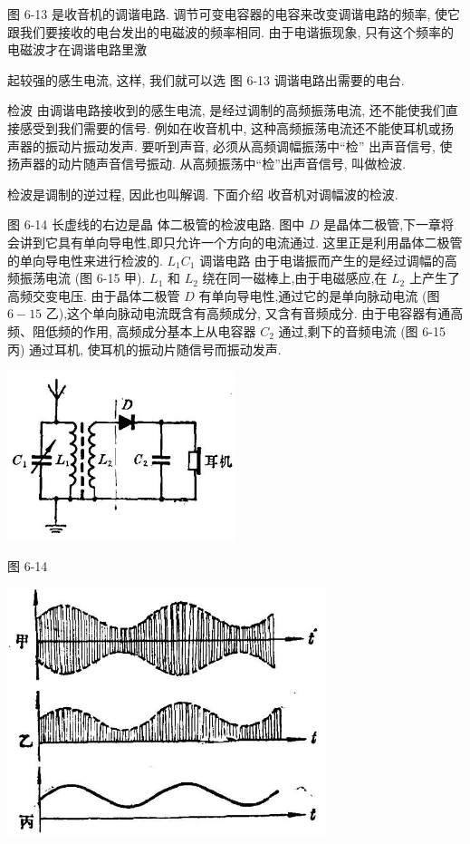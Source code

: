 \documentclass[10pt]{article}
\begin{document}
图 6-13 是收音机的调谐电路. 调节可变电容器的电容来改变调谐电路的频率, 使它跟我们要接收的电台发出的电磁波的频率相同. 由于电谐振现象, 只有这个频率的电磁波才在调谐电路里激

起较强的感生电流, 这样, 我们就可以选 图 6-13 调谐电路出需要的电台.

检波 由调谐电路接收到的感生电流, 是经过调制的高频振荡电流, 还不能使我们直接感受到我们需要的信号. 例如在收音机中, 这种高频振荡电流还不能使耳机或扬声器的振动片振动发声. 要听到声音, 必须从高频调幅振荡中“检” 出声音信号, 使扬声器的动片随声音信号振动. 从高频振荡中“检”出声音信号, 叫做检波.

检波是调制的逆过程, 因此也叫解调. 下面介绍 收音机对调幅波的检波.

图 6-14 长虚线的右边是晶 体二极管的检波电路. 图中 \(D\) 是晶体二极管,下一章将会讲到它具有单向导电性,即只允许一个方向的电流通过. 这里正是利用晶体二极管的单向导电性来进行检波的. \({L}_{1}{C}_{1}\) 调谐电路 由于电谐振而产生的是经过调幅的高频振荡电流 (图 6-15 甲). \({L}_{1}\) 和 \({L}_{2}\) 绕在同一磁棒上,由于电磁感应,在 \({L}_{2}\) 上产生了高频交变电压. 由于晶体二极管 \(D\) 有单向导电性,通过它的是单向脉动电流 (图 \(6 - {15}\) 乙),这个单向脉动电流既含有高频成分, 又含有音频成分. 由于电容器有通高频、阻低频的作用, 高频成分基本上从电容器 \({C}_{2}\) 通过,剩下的音频电流 (图 6-15 丙) 通过耳机, 使耳机的振动片随信号而振动发声.

\begin{center}
\includegraphics[max width=0.5\textwidth]{images/01913056-1f15-74d8-9184-9aab52c9d66b_208_758731.jpg}
\end{center}

图 6-14

\begin{center}
\includegraphics[max width=0.7\textwidth]{images/01913056-1f15-74d8-9184-9aab52c9d66b_208_595746.jpg}
\end{center}
\end{document}
